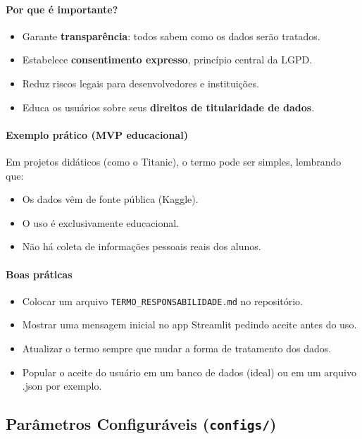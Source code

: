\documentclass[12pt,a4paper]{article}
\begin{document}
\paragraph{Por que é importante?}  
\begin{itemize}
  \item Garante \textbf{transparência}: todos sabem como os dados serão tratados.  
  \item Estabelece \textbf{consentimento expresso}, princípio central da LGPD.  
  \item Reduz riscos legais para desenvolvedores e instituições.  
  \item Educa os usuários sobre seus \textbf{direitos de titularidade de dados}.  
\end{itemize}

\paragraph{Exemplo prático (MVP educacional)}  
Em projetos didáticos (como o Titanic), o termo pode ser simples, lembrando que:  
\begin{itemize}
  \item Os dados vêm de fonte pública (Kaggle).  
  \item O uso é exclusivamente educacional.  
  \item Não há coleta de informações pessoais reais dos alunos.  
\end{itemize}

\paragraph{Boas práticas}  
\begin{itemize}
  \item Colocar um arquivo \texttt{TERMO\_RESPONSABILIDADE.md} no repositório.  
  \item Mostrar uma mensagem inicial no app Streamlit pedindo aceite antes do uso.  
  \item Atualizar o termo sempre que mudar a forma de tratamento dos dados.
  \item Popular o aceite do usuário em um banco de dados (ideal) ou em um arquivo .json por exemplo.
\end{itemize}


\subsection{Parâmetros Configuráveis (\texttt{configs/})}
\end{document}
